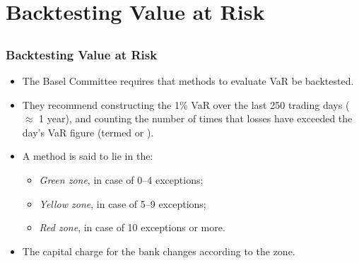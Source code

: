 \section[Backtesting]{Backtesting Value at Risk}\subsection*{}

\begin{frame}%

\frametitle{Backtesting Value at Risk}

\begin{itemize}
\item The Basel Committee requires that methods to evaluate VaR be
backtested.

\item They recommend constructing the 1\% VaR over the last 250 trading days
($\approx $ 1 year), and counting the number of times that losses have exceeded the
day's VaR figure (termed  or  ).

\item A method is said to lie in the:

\begin{itemize}
\item \emph{\color{green}Green zone}, in case of 0--4 exceptions;

\item \emph{\color{orange}Yellow zone}, in case of 5--9 exceptions;

\item \emph{\color{red}Red zone}, in case of 10 exceptions or more.
\end{itemize}
\item The capital charge for the bank changes according to the zone.
\end{itemize}

\end{frame}%

